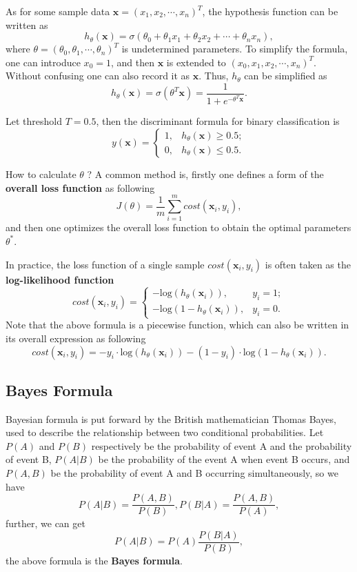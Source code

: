As for some sample data $\mathbf{x} = (x_1,x_2,\cdots,x_n)^T$, the hypothesis function can be written as
$$h_\theta(\mathbf{x}) = \sigma(\theta_0+\theta_1 x_1+\theta_2 x_2+\cdots+\theta_n x_n),$$
where $\theta = (\theta_0,\theta_1,\cdots,\theta_n)^T$ is undetermined parameters. To simplify the formula, one can introduce $x_0 = 1$, and then $\mathbf{x}$ is extended to $(x_0,x_1,x_2,\cdots,x_n)^T$. Without confusing one can also record it as $\mathbf{x}$. Thus, $h_\theta$ can be simplified as 
$$h_\theta(\mathbf{x}) = \sigma(\theta^T \mathbf{x}) = \frac{1}{1+e^{-\theta^T \mathbf{x}}}.$$

Let threshold $T = 0.5$, then the discriminant formula for binary classification is
$$y(\mathbf{x})=
\begin{cases}
1,& h_\theta(\mathbf{x})\geq 0.5;\\
0,& h_\theta(\mathbf{x})\le 0.5.
\end{cases}$$

How to calculate $\theta$ ? A common method is, firstly one defines a form of the \textbf{overall loss function} as following
$$ J(\theta) = \frac{1}{m}\sum^m_{i=1}cost(\mathbf{x}_i,y_i),$$
and then one optimizes the overall loss function to obtain the optimal parameters $\theta^*$.

In practice, the loss function of a single sample $cost(\mathbf{x}_i,y_i)$ is often taken as the \textbf{log-likelihood function}
$$cost(\mathbf{x}_i,y_i)=
\begin{cases}
-\mathrm{log}(h_\theta(\mathbf{x}_i)),& y_i=1;\\
-\mathrm{log}(1-h_\theta(\mathbf{x}_i)),& y_i=0.
\end{cases}$$
Note that the above formula is a piecewise function, which can also be written in its overall expression as following
$$cost(\mathbf{x}_i,y_i) = -y_i\cdot\mathrm{log}(h_\theta(\mathbf{x}_i))-(1-y_i)\cdot\mathrm{log}(1-h_\theta(\mathbf{x}_i)).$$

\subsection{Bayes Formula}
Bayesian formula is put forward by the British mathematician Thomas Bayes, used to describe the relationship between two conditional probabilities. Let $P(A)$ and $P(B)$ respectively be the probability of event A and the probability of event B, $P(A|B)$ be the probability of the event A when event B occurs, and $P(A,B)$ be the probability of event A and B occurring simultaneously, so we have
$$P(A|B)=\frac{P(A,B)}{P(B)}, P(B|A)=\frac{P(A,B)}{P(A)}, $$
further, we can get
$$P(A|B)=P(A)\frac{P(B|A)}{P(B)},$$
the above formula is the \textbf{Bayes formula}.

